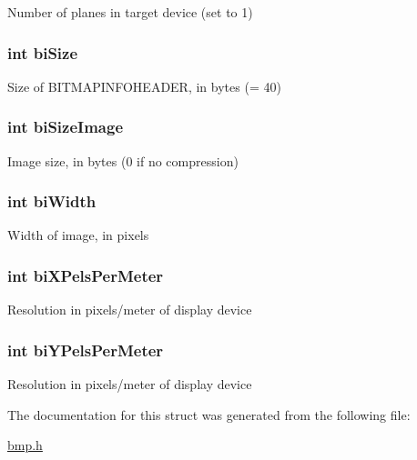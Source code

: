 Number of planes in target device (set to 1) \hypertarget{struct_b_m_p_header_adf06257c48b39f5858d2e07d85eaf444}{
\subsubsection[{bi\-Size}]{\setlength{\rightskip}{0pt plus 5cm}int bi\-Size}}\label{struct_b_m_p_header_adf06257c48b39f5858d2e07d85eaf444}
Size of B\-I\-T\-M\-A\-P\-I\-N\-F\-O\-H\-E\-A\-D\-E\-R, in bytes (= 40) \hypertarget{struct_b_m_p_header_a68e2cd9db6e5f913d47c13e68b6d47c8}{
\subsubsection[{bi\-Size\-Image}]{\setlength{\rightskip}{0pt plus 5cm}int bi\-Size\-Image}}\label{struct_b_m_p_header_a68e2cd9db6e5f913d47c13e68b6d47c8}
Image size, in bytes (0 if no compression) \hypertarget{struct_b_m_p_header_ace6c561432416b3580c63d8ff417769d}{
\subsubsection[{bi\-Width}]{\setlength{\rightskip}{0pt plus 5cm}int bi\-Width}}\label{struct_b_m_p_header_ace6c561432416b3580c63d8ff417769d}
Width of image, in pixels \hypertarget{struct_b_m_p_header_a8e1b6c75b62310e58d67b6c9d92c6e76}{
\subsubsection[{bi\-X\-Pels\-Per\-Meter}]{\setlength{\rightskip}{0pt plus 5cm}int bi\-X\-Pels\-Per\-Meter}}\label{struct_b_m_p_header_a8e1b6c75b62310e58d67b6c9d92c6e76}
Resolution in pixels/meter of display device \hypertarget{struct_b_m_p_header_ae4128f44823bc8af79105ba92ad33ec8}{
\subsubsection[{bi\-Y\-Pels\-Per\-Meter}]{\setlength{\rightskip}{0pt plus 5cm}int bi\-Y\-Pels\-Per\-Meter}}\label{struct_b_m_p_header_ae4128f44823bc8af79105ba92ad33ec8}
Resolution in pixels/meter of display device 

The documentation for this struct was generated from the following file\-:\begin{DoxyCompactItemize}
\item 
\hyperlink{bmp_8h}{bmp.\-h}\end{DoxyCompactItemize}
